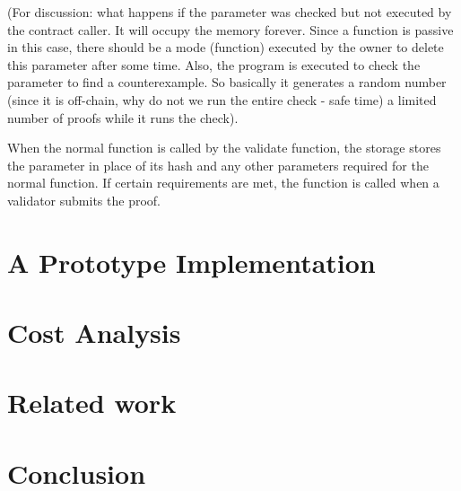 \documentclass[runningheads]{llncs}
\begin{document}
(For discussion: what happens if the parameter was checked but not executed by the contract caller. It will occupy the memory forever. Since a function is passive in this case, there should be a mode (function) executed by the owner to delete this parameter after some time. Also, the program is executed to check the parameter to find a counterexample. So basically it generates a random number (since it is off-chain, why do not we run the entire check - safe time) a limited number of proofs while it runs the check).

When the normal function is called by the validate function, the storage stores the parameter in place of its hash and any other parameters required for the normal function. If certain requirements are met, the function is called when a validator submits the proof.




\section{A Prototype Implementation}
\section{Cost Analysis}
\section{Related work}
\section{Conclusion}


\end{document}
